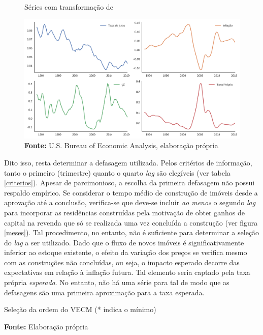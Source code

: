 \begin{figure}[htb]
	\centering
	\caption{Séries com transformação de \textcite{yeo_new_2000}}
	\label{YeoJhonson}
	\includegraphics[width=\textwidth]{../../Dados/Fatos_Estilizados/figs/YeoJohnson_All.png}
	\caption*{\textbf{Fonte:} U.S. Bureau of Economic Analysis, elaboração própria}
\end{figure}


Dito isso, resta determinar a defasagem utilizada. Pelos critérios de informação, tanto o primeiro (trimestre) quanto o quarto \textit{lag} são elegíveis (ver tabela \ref{criterios}). Apesar de parcimonioso, a escolha da primeira defasagem não possui respaldo empírico. Se considerar o tempo médio de construção de imóveis desde a aprovação até a conclusão, verifica-se que deve-se incluir \textit{ao menos} o segundo \textit{lag} para incorporar as residências construídas pela motivação de obter ganhos de capital na revenda que só se realizada uma vez concluída a construção (ver figura \ref{meses}). Tal procedimento, no entanto, não é suficiente para determinar a seleção do \textit{lag} a ser utilizado. Dado que o fluxo de novos imóveis é significativamente inferior ao estoque existente, o efeito da variação dos preços se verifica mesmo com as construções não concluídas, ou seja, o impacto esperado decorre das expectativas em relação à inflação futura.  Tal elemento seria captado pela taxa própria \textit{esperada}. No entanto, não há uma série para tal de modo que as defasagens são uma primeira aproximação para a taxa esperada.


\begin{table}[htb]
	\caption{Seleção da ordem do VECM (* indica o mínimo)}
	\label{criterios}

\caption*{\textbf{Fonte:} Elaboração própria}
\end{table}


